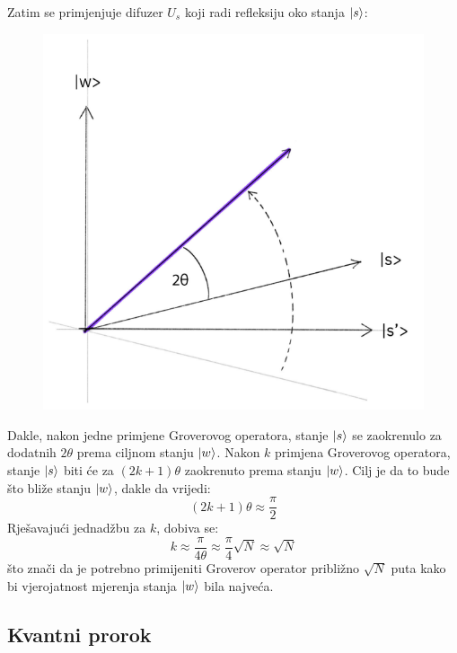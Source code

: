 Zatim se primjenjuje difuzer $U_s$ koji radi refleksiju oko stanja $\ket{s}$:

\begin{figure}[H]
\centering
\includegraphics[scale=0.4]{img/grover3.png}
\end{figure}

Dakle, nakon jedne primjene Groverovog operatora, stanje $\ket{s}$ se zaokrenulo za dodatnih $2\theta$ prema ciljnom stanju $\ket{w}$. Nakon $k$ primjena Groverovog operatora, stanje $\ket{s}$ biti će za $(2k + 1)\theta$ zaokrenuto prema stanju $\ket{w}$. Cilj je da to bude što bliže stanju $\ket{w}$, dakle da vrijedi:
\begin{equation}
(2k + 1)\theta \approx \frac{\pi}{2}
\end{equation}
Rješavajući jednadžbu za $k$, dobiva se:
\begin{equation}
k \approx \frac{\pi}{4\theta} \approx \frac{\pi}{4}\sqrt{N} \approx \sqrt{N}
\end{equation}
što znači da je potrebno primijeniti Groverov operator približno $\sqrt{N}$ puta kako bi vjerojatnost mjerenja stanja $\ket{w}$ bila najveća.

\subsection{Kvantni prorok}

